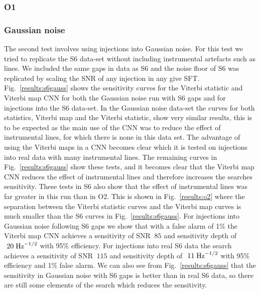 \subsubsection{O1}



\subsubsection{Gaussian noise}

The second test involves using injections into Gaussian noise. For this test we tried to replicate the S6 data-set without including instrumental artefacts such as lines. We included the same gaps in data as S6 and the noise floor of S6 was replicated by scaling the \ac{SNR} of any injection in any give \ac{SFT}. 
Fig.~\ref{results:s6gauss} shows the sensitivity curves for the Viterbi statistic and Viterbi map \ac{CNN} for both the Gaussian noise run with S6 gaps and for injections into the S6 data-set. 
In the Gaussian noise data-set the curves for both statistics, Viterbi map and the Viterbi statistic, show very similar results, this is to be expected as the main use of the \ac{CNN} was to reduce the effect of instrumental lines, for which there is none in this data set. 
The advantage of using the Viterbi maps in a \ac{CNN} becomes clear which it is tested on injections into real data with many instrumental lines. 
The remaining curves in Fig.~\ref{results:s6gauss} show these tests, and it becomes clear that the Viterbi map \ac{CNN} reduces the effect of instrumental lines and therefore increases the searches sensitivity. 
These tests in S6 also show that the effect of instrumental lines was far greater in this run than in O2. 
This is shown in Fig.~\ref{results:o2} where the separation between the Viterbi statistic curves and the Viterbi map curves is much smaller than the S6 curves in Fig.~\ref{results:s6gauss}.
For injections into Gaussian noise following S6 gaps we show that with a false alarm of 1\% the Viterbi map \ac{CNN} achieves a sensitivity of SNR $~85$ and sensitivity depth of $~20\; {\rm Hz}^{-1/2}$ with 95\% efficiency. For injections into real S6 data the search achieves a sensitivity of SNR $~115$ and sensitivity depth of $~11\; {\rm Hz}^{-1/2}$ with 95\% efficiency and 1\% false alarm. We can also see from Fig.~\ref{results:s6gauss} that the sensitivity in Gaussian noise with S6 gaps is better than in real S6 data, so there are still some elements of the search which reduces the sensitivity.

